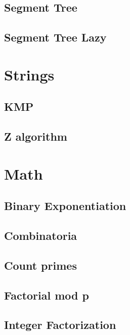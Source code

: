 \subsection{Segment Tree}
\raggedbottom
\hrulefill
\subsection{Segment Tree Lazy}
\raggedbottom
\hrulefill

\section{Strings}
\subsection{KMP}
\raggedbottom
\hrulefill
\subsection{Z algorithm}
\raggedbottom
\hrulefill

\section{Math}
\subsection{Binary Exponentiation}
\raggedbottom
\hrulefill
\subsection{Combinatoria}
\raggedbottom
\hrulefill
\subsection{Count primes}
\raggedbottom
\hrulefill
\subsection{Factorial mod p}
\raggedbottom
\hrulefill
\subsection{Integer Factorization}
\raggedbottom
\hrulefill
